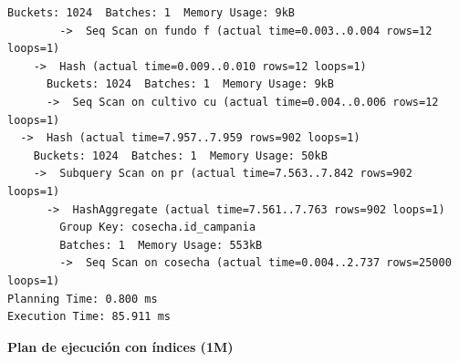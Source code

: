 \documentclass[11pt,letterpaper]{article}
\begin{document}
\begin{lstlisting}[style=plano]
        Buckets: 1024  Batches: 1  Memory Usage: 9kB
        ->  Seq Scan on fundo f (actual time=0.003..0.004 rows=12 loops=1)
    ->  Hash (actual time=0.009..0.010 rows=12 loops=1)
      Buckets: 1024  Batches: 1  Memory Usage: 9kB
      ->  Seq Scan on cultivo cu (actual time=0.004..0.006 rows=12 loops=1)
  ->  Hash (actual time=7.957..7.959 rows=902 loops=1)
    Buckets: 1024  Batches: 1  Memory Usage: 50kB
    ->  Subquery Scan on pr (actual time=7.563..7.842 rows=902 loops=1)
      ->  HashAggregate (actual time=7.561..7.763 rows=902 loops=1)
        Group Key: cosecha.id_campania
        Batches: 1  Memory Usage: 553kB
        ->  Seq Scan on cosecha (actual time=0.004..2.737 rows=25000 loops=1)
Planning Time: 0.800 ms
Execution Time: 85.911 ms
\end{lstlisting}

\textbf{Plan de ejecución con índices (1M)}
\end{document}
